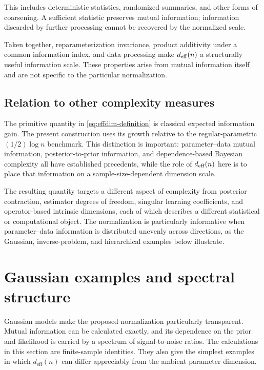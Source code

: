 \documentclass[11pt]{article}
\theoremstyle{plain}
\theoremstyle{definition}
\theoremstyle{remark}
\begin{document}
This includes deterministic statistics, randomized summaries, and other forms of coarsening. A sufficient statistic preserves mutual information; information discarded by further processing cannot be recovered by the normalized scale.

Taken together, reparameterization invariance, product additivity under a common information index, and data processing make $d_{\rm eff}(n)$ a structurally useful information scale. These properties arise from mutual information itself and are not specific to the particular normalization.

\subsection{Relation to other complexity measures}
\label{subsec:relation-complexity}

The primitive quantity in \eqref{eq:effdim-definition} is classical expected information gain. The present construction uses its growth relative to the regular-parametric $(1/2)\log n$ benchmark. This distinction is important: parameter--data mutual information, posterior-to-prior information, and dependence-based Bayesian complexity all have established precedents, while the role of $d_{\rm eff}(n)$ here is to place that information on a sample-size-dependent dimension scale.

The resulting quantity targets a different aspect of complexity from posterior contraction, estimator degrees of freedom, singular learning coefficients, and operator-based intrinsic dimensions, each of which describes a different statistical or computational object. The normalization is particularly informative when parameter–data information is distributed unevenly across directions, as the Gaussian, inverse-problem, and hierarchical examples below illustrate.

\section{Gaussian examples and spectral structure}
\label{sec:gaussian-examples}

Gaussian models make the proposed normalization particularly transparent. Mutual information can be calculated exactly, and its dependence on the prior and likelihood is carried by a spectrum of signal-to-noise ratios. The calculations in this section are finite-sample identities. They also give the simplest examples in which \(d_{\mathrm{eff}}(n)\) can differ appreciably from the ambient parameter dimension.
\end{document}
